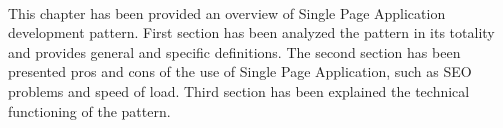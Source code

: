 \paragraph{}
This chapter has been provided an overview of Single Page Application development pattern. First section has been analyzed the pattern in its totality and provides general and specific definitions. The second section has been presented pros and cons of the use of Single Page Application, such as SEO problems and speed of load. Third section has been explained the technical functioning of the pattern. 